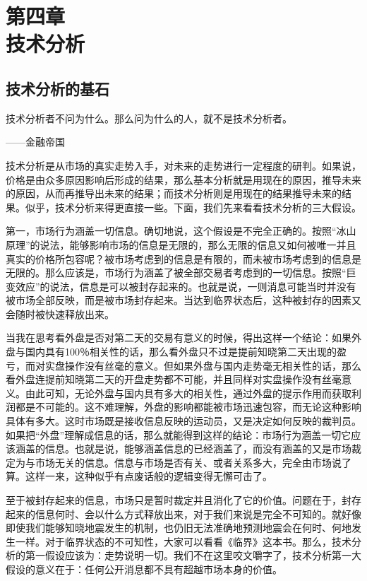\setcounter{figure}{0}
\renewcommand{\thefigure}{4-\arabic{figure}}

\section[第四章\q 技术分析]{第四章\\ 技术分析}

\subsection{技术分析的基石}

{\kaishu
技术分析者不问为什么。那么问为什么的人，就不是技术分析者。

\hfill ——金融帝国
}

技术分析是从市场的真实走势入手，对未来的走势进行一定程度的研判。如果说，价格是由众多原因影响后形成的结果，那么基本分析就是用现在的原因，推导未来的原因，从而再推导出未来的结果；而技术分析则是用现在的结果推导未来的结果。似乎，技术分析来得更直接一些。下面，我们先来看看技术分析的三大假设。

第一，市场行为涵盖一切信息。确切地说，这个假设是不完全正确的。按照“冰山原理”的说法，能够影响市场的信息是无限的，那么无限的信息又如何被唯一并且真实的价格所包容呢？被市场考虑到的信息是有限的，而未被市场考虑到的信息是无限的。那么应该是，市场行为涵盖了被全部交易者考虑到的一切信息。按照“巨变效应”的说法，信息是可以被封存起来的。也就是说，一则消息可能当时并没有被市场全部反映，而是被市场封存起来。当达到临界状态后，这种被封存的因素又会随时被快速释放出来。

当我在思考看外盘是否对第二天的交易有意义的时候，得出这样一个结论：如果外盘与国内具有100％相关性的话，那么看外盘只不过是提前知晓第二天出现的盈亏，而对实盘操作没有丝毫的意义。但如果外盘与国内走势毫无相关性的话，那么看外盘连提前知晓第二天的开盘走势都不可能，并且同样对实盘操作没有丝毫意义。由此可知，无论外盘与国内具有多大的相关性，通过外盘的提示作用而获取利润都是不可能的。这不难理解，外盘的影响都能被市场迅速包容，而无论这种影响具体有多大。这时市场既是接收信息反映的运动员，又是决定如何反映的裁判员。如果把“外盘”理解成信息的话，那么就能得到这样的结论：市场行为涵盖一切它应该涵盖的信息。也就是说，能够涵盖信息的已经涵盖了，而没有涵盖的又是市场裁定为与市场无关的信息。信息与市场是否有关、或者关系多大，完全由市场说了算。这样一来，这种似乎有点废话般的逻辑变得无懈可击了。

至于被封存起来的信息，市场只是暂时裁定并且消化了它的价值。问题在于，封存起来的信息何时、会以什么方式释放出来，对于我们来说是完全不可知的。就好像即使我们能够知晓地震发生的机制，也仍旧无法准确地预测地震会在何时、何地发生一样。对于临界状态的不可知性，大家可以看看《临界》这本书。那么，技术分析的第一假设应该为：走势说明一切。我们不在这里咬文嚼字了，技术分析第一大假设的意义在于：任何公开消息都不具有超越市场本身的价值。

